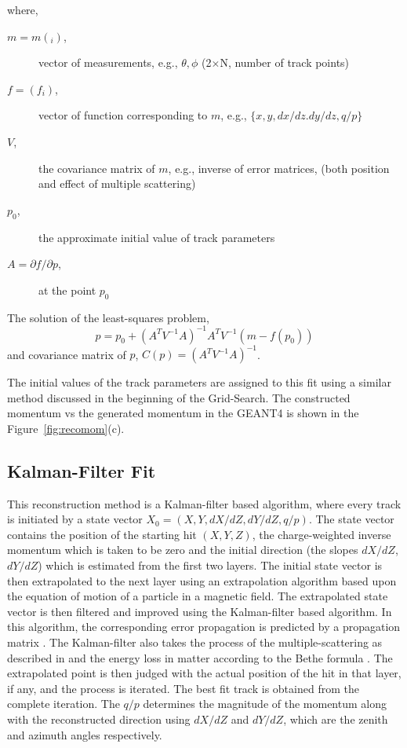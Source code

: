 where,
\begin{description}
\item [$m = m(_i)$,] vector of measurements, e.g., $\theta, \phi$ (2$\times$N, number of track points)
\item [$f = (f_i)$,] vector of function corresponding to $m$, e.g., $\{x,y,dx/dz. dy/dz, q/p\}$
\item [$V$,] the covariance matrix of $m$, e.g., inverse of error matrices, (both position and effect of multiple scattering)
\item [$p_0$,] the approximate initial value of track parameters
\item [$A = \partial f/\partial p$,] at the point $p_0$
\end{description}

The solution of the least-squares problem,
\[p = p_0 + (A^T V^{-1} A)^{-1} A^T V ^{-1} (m -f(p_0))\]
and covariance matrix of $p$, $C(p) = (A^TV^{-1}A)^{-1}$.

The initial values of the track parameters are assigned to this fit
using a similar method discussed in the beginning of the Grid-Search.
The constructed momentum vs the generated momentum in the GEANT4 is
shown in the Figure~\ref{fig:recomom}(c).


\subsection{Kalman-Filter Fit}
This reconstruction method is a Kalman-filter based algorithm, where
every track is initiated by a state vector
$X_{0}=\left(X,Y,dX/dZ,dY/dZ,q/p\right)$. The state vector contains
the position of the starting hit $\left(X,Y,Z\right)$,
the charge-weighted inverse momentum which is taken to be zero and
the initial direction (the slopes $dX/dZ$, $dY/dZ$) which is
estimated from the first two layers. The initial state vector is then
extrapolated to the next layer using an extrapolation algorithm based
upon the equation of motion of a particle in a magnetic field. The
extrapolated state vector is then filtered and improved using the
Kalman-filter based algorithm. In this algorithm, the corresponding
error propagation is predicted by a propagation matrix \cite{kalman1}.
The Kalman-filter also takes the process of the multiple-scattering
as described in \cite{kalman2} and the energy loss in matter according
to the Bethe formula \cite{bethe1}. The extrapolated point is then
judged with the actual position of the hit in that layer, if any, and
the process is iterated. The best fit track is obtained from the
complete iteration. The $q/p$ determines the magnitude of the momentum
along with the reconstructed direction using $dX/dZ$ and $dY/dZ$, which
are the zenith and azimuth angles respectively.

